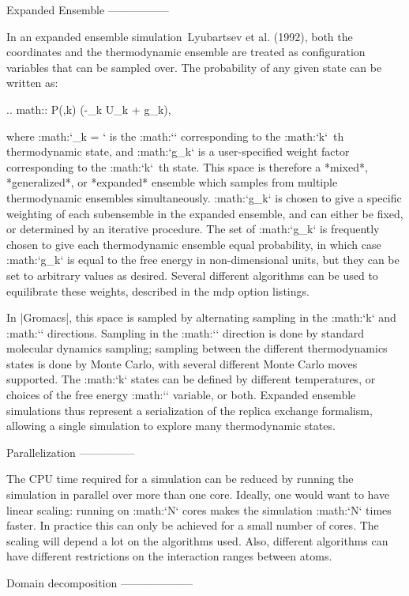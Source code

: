 Expanded Ensemble
-----------------

In an expanded ensemble simulation Lyubartsev et al. (1992), both the
coordinates and the thermodynamic ensemble are treated as configuration
variables that can be sampled over. The probability of any given state
can be written as:

.. math:: P(,k) \propto \exp\left(-\beta_k U_k + g_k\right),

where :math:`\beta_k = ` is the :math:`\beta`
corresponding to the :math:`k`\ th thermodynamic state, and :math:`g_k`
is a user-specified weight factor corresponding to the :math:`k`\ th
state. This space is therefore a *mixed*, *generalized*, or *expanded*
ensemble which samples from multiple thermodynamic ensembles
simultaneously. :math:`g_k` is chosen to give a specific weighting of
each subensemble in the expanded ensemble, and can either be fixed, or
determined by an iterative procedure. The set of :math:`g_k` is
frequently chosen to give each thermodynamic ensemble equal probability,
in which case :math:`g_k` is equal to the free energy in non-dimensional
units, but they can be set to arbitrary values as desired. Several
different algorithms can be used to equilibrate these weights, described
in the mdp option listings.

In |Gromacs|, this space is sampled by
alternating sampling in the :math:`k` and :math:`` directions.
Sampling in the :math:`` direction is done by standard molecular
dynamics sampling; sampling between the different thermodynamics states
is done by Monte Carlo, with several different Monte Carlo moves
supported. The :math:`k` states can be defined by different
temperatures, or choices of the free energy :math:`\lambda` variable, or
both. Expanded ensemble simulations thus represent a serialization of
the replica exchange formalism, allowing a single simulation to explore
many thermodynamic states.

Parallelization
---------------

The CPU time required for a simulation can be reduced by running the
simulation in parallel over more than one core. Ideally, one would want
to have linear scaling: running on :math:`N` cores makes the simulation
:math:`N` times faster. In practice this can only be achieved for a
small number of cores. The scaling will depend a lot on the algorithms
used. Also, different algorithms can have different restrictions on the
interaction ranges between atoms.

Domain decomposition
--------------------

